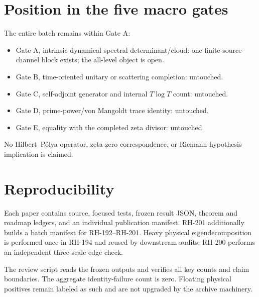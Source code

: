\documentclass[12pt]{article}
\theoremstyle{remark}
\begin{document}
\section{Position in the five macro gates}

The entire batch remains within Gate A:
\begin{itemize}[leftmargin=2em]
\item Gate A, intrinsic dynamical spectral determinant/cloud: one finite
 source-channel block exists; the all-level object is open.
\item Gate B, time-oriented unitary or scattering completion: untouched.
\item Gate C, self-adjoint generator and internal $T\log T$ count: untouched.
\item Gate D, prime-power/von Mangoldt trace identity: untouched.
\item Gate E, equality with the completed zeta divisor: untouched.
\end{itemize}

No Hilbert--P\'olya operator, zeta-zero correspondence, or
Riemann-hypothesis implication is claimed.

\section{Reproducibility}

Each paper contains source, focused tests, frozen result JSON, theorem and
roadmap ledgers, and an individual publication manifest.  RH-201 additionally
builds a batch manifest for RH-192--RH-201.  Heavy physical eigendecomposition
is performed once in RH-194 and reused by downstream audits; RH-200 performs
an independent three-scale edge check.

The review script reads the frozen outputs and verifies all key counts and
claim boundaries.  The aggregate identity-failure count is zero.  Floating
physical positives remain labeled as such and are not upgraded by the
archive machinery.



\end{document}
